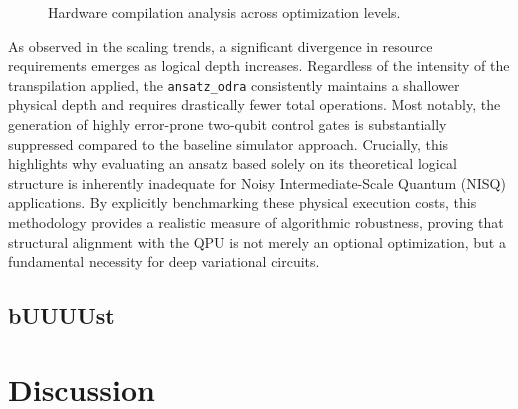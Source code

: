 \documentclass[11pt]{article}
\begin{document}
\begin{figure}[H]
\begin{subfigure}[b]{0.48\textwidth}
    \end{subfigure}
    \caption{Hardware compilation analysis across optimization levels.}
    \label{fig:gate_overhead_grid}
\end{figure}

As observed in the scaling trends, a significant divergence in resource requirements emerges as logical depth increases. Regardless of the intensity of the transpilation applied, the \texttt{ansatz\_odra} consistently maintains a shallower physical depth and requires drastically fewer total operations. Most notably, the generation of highly error-prone two-qubit control gates is substantially suppressed compared to the baseline simulator approach. Crucially, this highlights why evaluating an ansatz based solely on its theoretical logical structure is inherently inadequate for Noisy Intermediate-Scale Quantum (NISQ) applications. By explicitly benchmarking these physical execution costs, this methodology provides a realistic measure of algorithmic robustness, proving that structural alignment with the QPU is not merely an optional optimization, but a fundamental necessity for deep variational circuits.

\subsection{bUUUUst}

\section{Discussion}
\end{document}
